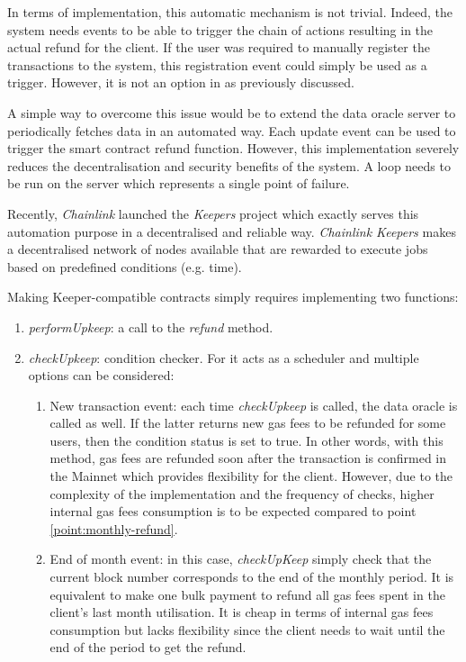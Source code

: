 In terms of implementation, this automatic mechanism is not trivial. Indeed, the system needs events to be able to trigger the chain of actions resulting in the actual refund for the client. If the user was required to manually register the transactions to the system,
this registration event could simply be used as a trigger. However, it is not an option in {\projectName} as previously discussed. 

A simple way to  overcome this issue would be to extend the data oracle server to periodically fetches data in an automated way. Each update event can be used to trigger the smart contract refund function. However, this implementation severely reduces the decentralisation and security benefits of the system. A loop needs to be run on the server which represents a single point of failure.

Recently, \textit{Chainlink} launched the \textit{Keepers}\cite{IntroductionChainlinkKeepers} project which exactly serves this automation purpose in a decentralised and reliable way. \textit{Chainlink Keepers} makes a decentralised network of nodes available that are rewarded to execute jobs based on predefined conditions (e.g. time).  

Making Keeper-compatible contracts\cite{MakingKeepercompatibleContracts} simply requires implementing two functions:
\begin{enumerate}
    \item \textit{performUpkeep}: a call to the {\projectName} \textit{refund} method.
    \item \textit{checkUpkeep}: condition checker. For {\projectName} it acts as a scheduler and multiple options can be considered:
    \begin{enumerate}
        \item New transaction event: each time \textit{checkUpkeep} is called, the data oracle is called as well. If the latter returns new gas fees to be refunded for some users, then the condition status is set to true. In other words, with this method, gas fees are refunded soon after the transaction is confirmed in the Mainnet which provides flexibility for the client. However, due to the complexity of the implementation and the frequency of checks, higher internal gas fees consumption is to be expected compared to point \ref{point:monthly-refund}. 
        \item \label{point:monthly-refund} End of month event: in this case, \textit{checkUpKeep} simply check that the current block number corresponds to the end of the monthly period. It is equivalent to make one bulk payment to refund all gas fees spent in the client's last month utilisation. It is cheap in terms of internal gas fees consumption but lacks flexibility since the client needs to wait until the end of the period to get the refund.  
    \end{enumerate}
\end{enumerate}

